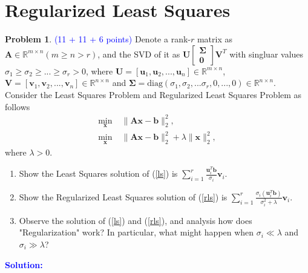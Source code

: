 \documentclass[english,onecolumn]{IEEEtran}
\begin{document}
\section{Regularized Least Squares}
\noindent\textbf{Problem 1}. \textcolor{blue}{(11 + 11 + 6 points)} Denote a rank-$r$ matrix as $\mathbf{A}\in \mathbb{R}^{m\times n} (m\geq n > r)$, 
and the SVD of it as $\mathbf{U}\begin{bmatrix}\mathbf{\Sigma}\\\mathbf{0}\end{bmatrix}\mathbf{V}^T$ with singluar values $\sigma_1 \geq \sigma_2 \geq ... \geq \sigma_r > 0$,
where $\mathbf{U} = [\mathbf{u}_1,\mathbf{u}_2,...,\mathbf{u}_n]\in \mathbb{R}^{m\times n}$,
 $\mathbf{V} = [\mathbf{v}_1,\mathbf{v}_2,...,\mathbf{v}_n]\in \mathbb{R}^{n\times n}$
 and $\mathbf{\Sigma} = \text{diag}(\sigma_1,\sigma_2,...\sigma_r,0,...,0) \in \mathbb{R}^{n\times n}$.
 Consider the Least Squares Problem and Regularized Least Squares Problem as follows
\begin{align}
    \min_{\mathbf{x}} \; & \|\mathbf{A}\mathbf{x} - \mathbf{b}\|_2^2, \label{ls} \\
    \min_{\mathbf{x}} \; & \|\mathbf{A}\mathbf{x} - \mathbf{b}\|_2^2 + \lambda \|\mathbf{x}\|_2^2, \label{rls}
\end{align}
where $\lambda > 0$.
\begin{enumerate}
    \item Show the Least Squares solution of (\ref{ls}) is $\sum_{i = 1}^r \frac{\mathbf{u}_i^T\mathbf{b}}{\sigma_i}\mathbf{v}_i$.
    \item Show the Regularized Least Squares solution of (\ref{rls}) is $\sum_{i = 1}^r \frac{\sigma_i(\mathbf{u}_i^T\mathbf{b})}{\sigma_i^2+\lambda}\mathbf{v}_i$.
    \item Observe the solution of (\ref{ls}) and (\ref{rls}), and analysis how does "Regularization" work? In particular, what might happen when $\sigma_i \ll \lambda$ and $\sigma_i \gg \lambda$?
\end{enumerate}
\noindent\textcolor{blue}{
	\textbf{Solution:}
}
\end{document}

